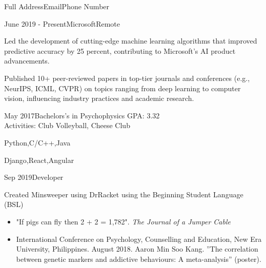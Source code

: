 \documentclass{resume}
\begin{document}
\begin{Introduction}{Full Address}{Email}{Phone Number}

\end{Introduction}

\begin{Section}[Experience]
\begin{Experience}{June 2019 - Present}{Microsoft}{Remote}

\item Led the development of cutting-edge machine learning algorithms that improved predictive accuracy by 25 percent, contributing to Microsoft's AI product advancements.

\item Published 10+ peer-reviewed papers in top-tier journals and conferences (e.g., NeurIPS, ICML, CVPR) on topics ranging from deep learning to computer vision, influencing industry practices and academic research.
\end{Experience}
\end{Section}

\begin{Section}[Education]
\begin{Education}{May 2017}{Bachelors's in Psychophysics}
GPA: 3.32 \\
Activities: Club Volleyball, Cheese Club
\end{Education}
\end{Section}

\begin{Section}
\begin{Skill}[Languages]{Python,C/C++,Java}
\end{Skill}
\begin{Skill}{Django,React,Angular}
\end{Skill}
\end{Section}

\begin{Section}[Projects]
\begin{Experience}[Minesweeper]{Sep 2019}{Developer}{}
\item Created Minsweeper using DrRacket using the Beginning Student Language (BSL)
\end{Experience}
\end{Section}

\begin{Section}[Publications]
\begin{itemize}
\item "If pigs can fly then 2 + 2 = 1,782". \textit{The Journal of a Jumper Cable}
\end{itemize}
\end{Section}

\begin{Section}[Presentations]
\begin{itemize}
\item International Conference on Psychology, Counselling and Education, New Era University, Philippines.
August 2018. Aaron Min Soo Kang. ”The correlation between genetic markers and addictive behaviours: A meta-analysis” (poster).
\end{itemize}
\end{Section}
\end{document}
